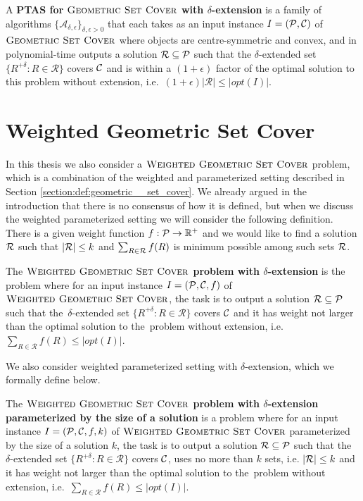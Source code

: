 \begin{defi}
A \textbf{PTAS for $\textsc{Geometric Set Cover}$
with $\delta$-extension} is a family of algorithms
$\{\mathcal{A}_{\delta, \epsilon}\}_{\delta, \epsilon > 0}$ that
each takes as an input instance $I=(\mathcal{P}, \mathcal{C})$
of $\textsc{Geometric Set Cover}$ where objects are centre-symmetric and convex,
and in polynomial-time outputs a solution $\mathcal{R} \subseteq \mathcal{P}$
such that the $\delta$-extended set
$\{ R^{+\delta} :  R \in \mathcal{R} \}$ covers $\mathcal{C}$
and is within a $(1+\epsilon)$ factor of the optimal
solution to this problem without
extension, i.e.~$(1+\epsilon)|\mathcal{R}| \le |opt(I)|$.
\end{defi}

\section{Weighted Geometric Set Cover}

In this thesis we also consider a $\textsc{Weighted Geometric Set Cover}$ problem,
which is a combination
of the weighted and parameterized setting described in 
Section \ref{section:def:geometric__set_cover}.
We already argued in the introduction
that there is no consensus of how it is defined, but when we discuss the
weighted parameterized setting we will consider the following
definition. There is a given weight function
$f : \mathcal{P} \rightarrow \mathbb{R^+}$
and we would like to find a solution $\mathcal{R}$
such that $|\mathcal{R}| \le k$
and $\sum_{R \in \mathcal{R}} f(R)$ is minimum possible among such sets $\mathcal{R}$.

\begin{defi}
The \textbf{$\textsc{Weighted Geometric Set Cover}$ problem
with $\delta$-extension} is the problem where for an input instance
$I=(\mathcal{P}, \mathcal{C}, f)$ of $\textsc{Weighted Geometric Set Cover}$,
the task is to output a solution $\mathcal{R} \subseteq \mathcal{P}$
such that the~$\delta$-extended set
$\{ R^{+\delta} :  R \in \mathcal{R} \}$ covers $\mathcal{C}$
and it has weight not larger than the optimal solution to the~problem without
extension, i.e.~$\sum_{R \in \mathcal{R}} f(R) \le |opt(I)|$.
\end{defi}

We also consider weighted parameterized setting with $\delta$-extension,
which we formally define below.

\begin{defi}
The \textbf{$\textsc{Weighted Geometric Set Cover}$ problem
with $\delta$-extension parameterized by the size of a solution}
is a problem where for an input instance
${I=(\mathcal{P}, \mathcal{C}, f, k)}$ of $\textsc{Weighted Geometric Set Cover}$
parameterized by the size of a solution $k$,
the task is to output a solution $\mathcal{R} \subseteq \mathcal{P}$
such that the~$\delta$-extended set
$\{ R^{+\delta} :  R \in \mathcal{R} \}$ covers $\mathcal{C}$,
uses no more than $k$ sets, i.e. $|\mathcal{R}| \le k$
and it has weight not larger than the optimal solution to the~problem without
extension, i.e.~$\sum_{R \in \mathcal{R}} f(R) \le |opt(I)|$.
\end{defi}
